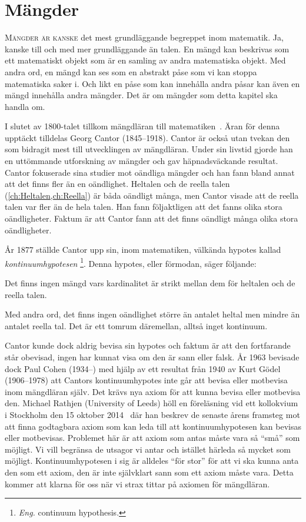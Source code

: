 \chapter{Mängder}%
\label{ch:Mangder}%
\lettrine{M}{ängder är kanske} det mest grundläggande begreppet inom matematik.
Ja, kanske till och med mer grundläggande än talen.
En mängd kan beskrivas som ett matematiskt objekt som är en samling av andra
matematiska objekt.
Med andra ord, en mängd kan ses som en abstrakt påse som vi kan stoppa
matematiska saker i.
Och likt en påse som kan innehålla andra påsar kan även en mängd
innehålla andra mängder.
Det är om mängder som detta kapitel ska handla om.

I slutet av 1800-talet tillkom mängdläran till 
matematiken~\cite{Kline1990mtf3}.
Äran för denna upptäckt tilldelas Georg Cantor (1845--1918).
Cantor är också utan tvekan den som bidragit mest till utvecklingen av
mängdläran.
Under sin livstid gjorde han en uttömmande utforskning av mängder och gav
häpnadsväckande resultat.
Cantor fokuserade sina studier mot oändliga mängder och han fann bland annat
att det finns fler än en oändlighet.
Heltalen och de reella talen (\cref{ch:Heltalen,ch:Reella}) är båda oändligt 
många, men Cantor visade att de reella talen var fler än de hela talen.
Han fann följaktligen att det fanns olika stora oändligheter.
Faktum är att Cantor fann att det finns oändligt många olika stora 
oändligheter.

År 1877 ställde Cantor upp sin, inom matematiken, välkända hypotes kallad
\emph{kontinuumhypotesen}%
%
\footnote{\emph{Eng.} continuum hypothesis.}.
Denna hypotes, eller förmodan, säger följande:
\begin{conjecture}[Kontinuumhypotesen]\label{Kontinuumhypotesen}
  Det finns ingen mängd vars kardinalitet är strikt mellan dem för heltalen
  och de reella talen.
\end{conjecture}
Med andra ord, det finns ingen oändlighet större än antalet heltal men mindre
än antalet reella tal.
Det är ett tomrum däremellan, alltså inget kontinuum.

Cantor kunde dock aldrig bevisa sin hypotes och faktum är att den fortfarande 
står obevisad, ingen har kunnat visa om den är sann eller falsk.
År 1963 bevisade dock Paul Cohen (1934--) med hjälp av ett resultat från 1940 
av Kurt Gödel (1906--1978) att Cantors kontinuumhypotes inte går att bevisa 
eller motbevisa inom mängdläran själv.
Det krävs nya axiom för att kunna bevisa eller motbevisa den.
Michael Rathjen (University of Leeds) höll en föreläsning vid ett kollokvium 
i Stockholm den 15 oktober 2014~\cite{smcrathjen} där han beskrev de senaste 
årens framsteg mot att finna godtagbara axiom som kan leda till att 
kontinuumhypotesen kan bevisas eller motbevisas.
Problemet här är att axiom som antas måste vara så \enquote{små} som möjligt.  
Vi vill begränsa de utsagor vi antar och istället härleda så mycket som 
möjligt.
Kontinuumhypotesen i sig är alldeles \enquote{för stor} för att vi ska kunna 
anta den som ett axiom, den är inte självklart sann som ett axiom måste vara.
Detta kommer att klarna för oss när vi strax tittar på axiomen för mängdläran.


